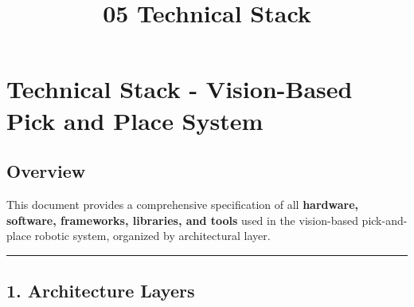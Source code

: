 \documentclass[
]{article}
\title{05 Technical Stack}
\author{}
\date{}
\begin{document}
\maketitle

{
\setcounter{tocdepth}{3}
\tableofcontents
}
\hypertarget{technical-stack---vision-based-pick-and-place-system}{%
\section{Technical Stack - Vision-Based Pick and Place
System}\label{technical-stack---vision-based-pick-and-place-system}}

\hypertarget{overview}{%
\subsection{Overview}\label{overview}}

This document provides a comprehensive specification of all
\textbf{hardware, software, frameworks, libraries, and tools} used in
the vision-based pick-and-place robotic system, organized by
architectural layer.

\begin{center}\rule{0.5\linewidth}{0.5pt}\end{center}

\hypertarget{architecture-layers}{%
\subsection{1. Architecture Layers}\label{architecture-layers}}
\end{document}
